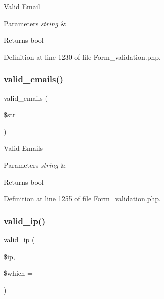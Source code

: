 Valid Email


\begin{DoxyParams}{Parameters}
{\em string} & \\
\hline
\end{DoxyParams}
\begin{DoxyReturn}{Returns}
bool 
\end{DoxyReturn}


Definition at line 1230 of file Form\+\_\+validation.\+php.

\mbox{\label{class_c_i___form__validation_a7692019b59978c17621e3920823621c4}} 
\subsubsection{\texorpdfstring{valid\_emails()}{valid\_emails()}}
{\footnotesize\ttfamily valid\+\_\+emails (\begin{DoxyParamCaption}\item[{}]{\$str }\end{DoxyParamCaption})}

Valid Emails


\begin{DoxyParams}{Parameters}
{\em string} & \\
\hline
\end{DoxyParams}
\begin{DoxyReturn}{Returns}
bool 
\end{DoxyReturn}


Definition at line 1255 of file Form\+\_\+validation.\+php.

\mbox{\label{class_c_i___form__validation_a10da42e1fde6cd5b335efcd2338c4ff8}} 
\subsubsection{\texorpdfstring{valid\_ip()}{valid\_ip()}}
{\footnotesize\ttfamily valid\+\_\+ip (\begin{DoxyParamCaption}\item[{}]{\$ip,  }\item[{}]{\$which = {\ttfamily \textquotesingle{}\textquotesingle{}} }\end{DoxyParamCaption})}

